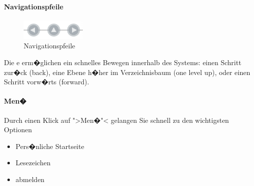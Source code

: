 \paragraph{Navigationspfeile}
\label{navigationspfeile}

\begin{figure}[!ht]
  \centering
  \includegraphics[scale=0.7]{./images/navigationspfeile.png}
  \caption{Navigationspfeile}
  \label{fig:navigationspfeile}
\end{figure}

Die e erm�glichen ein schnelles Bewegen
innerhalb des Systems: einen Schritt zur�ck (back), eine Ebene h�her
im Verzeichnisbaum (one level up), oder einen Schritt vorw�rts
(forward).

%
%

\paragraph{Men�}
Durch einen Klick auf ">Men�"< gelangen Sie schnell zu den wichtigsten Optionen
\begin{itemize}
	\item Pers�nliche Startseite
	\item Lesezeichen
	\item abmelden
\end{itemize}

